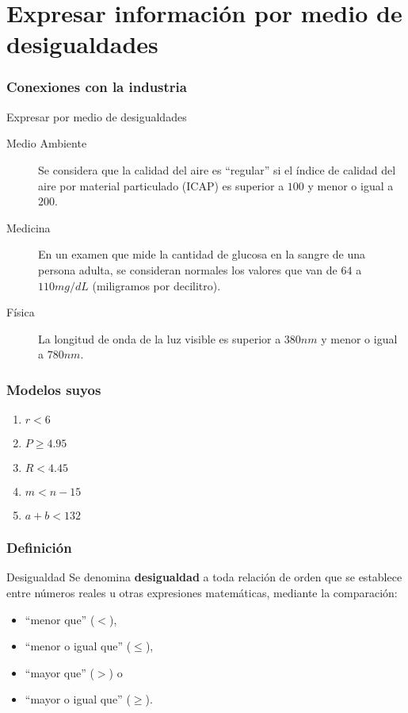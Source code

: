 \documentclass[12pt,handout,spanish,x11names]{beamer}
\title{\talktitle}
\subtitle{\talksubtitle}
\author{\talkauthor}
\institute{\talkaffiliation}
\date{\footnotesize{\emph{\href{\talkblog}{\talkemail}}}}
\begin{document}
\begin{frame}
\titlepage
\end{frame}
\section{Expresar información por medio de desigualdades}
\begin{frame}
  \frametitle{Conexiones con la industria}
  \begin{exampleblock}{Expresar por medio de desigualdades}
    \begin{description}
    \item[Medio Ambiente] Se considera que la calidad del aire es ``regular'' si el índice de
      calidad del aire por material particulado (ICAP) es superior a $100$ y
      menor o igual a $200$.
    \item[Medicina] En un examen que mide la cantidad de glucosa en la sangre de
      una persona adulta, se consideran normales los valores que van de $64$ a
      $110 mg/dL$ (miligramos por decilitro).
    \item[Física] La longitud de onda
      de la luz visible es superior a $380 nm$ y menor o igual a $780 nm$.
    \end{description}
  \end{exampleblock}
\end{frame}
\begin{frame}
  \frametitle{Modelos suyos}
  \begin{exampleblock}{}
    \begin{enumerate}
    \item $r<6$
    \item $P\geq 4.95$
    \item $R<4.45$
    \item $m<n-15$
    \item $a+b<132$
    \end{enumerate}
  \end{exampleblock}
\end{frame}
\begin{frame}
  \frametitle{Definición}
  \begin{block}{Desigualdad}
    Se denomina \textbf{desigualdad} a toda relación de orden que se establece entre números reales u otras
    expresiones matemáticas, mediante la comparación:
    \begin{itemize}
    \item ``menor que'' ($<$),
    \item ``menor o igual que'' ($\leq$),
    \item ``mayor que'' ($>$) o
    \item ``mayor o igual que'' ($\geq$).
    \end{itemize}
  \end{block}
\end{frame}
\end{document}
